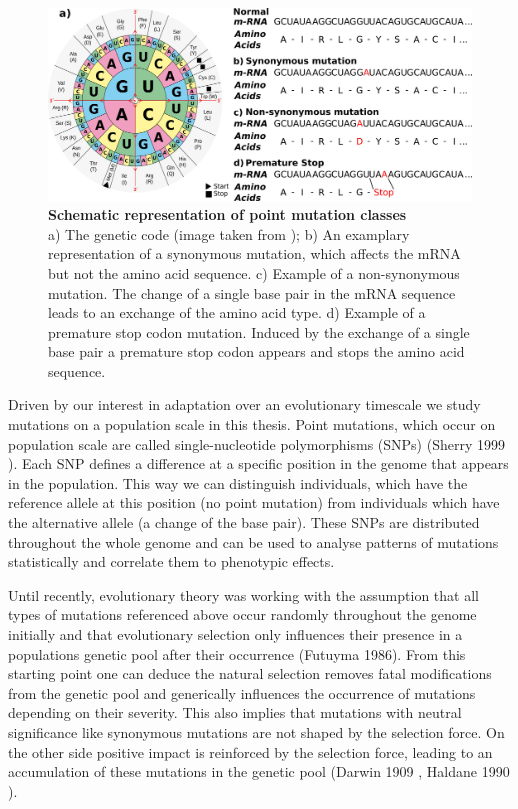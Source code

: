 \begin{figure}[tb]
    \centering
    \begin{minipage}[h]{0.9\textwidth}
      \centering
      \includegraphics[width=1\textwidth]{images/Mutations.png}
      \caption[Schematic representation of point mutation classes]{\textbf{Schematic representation of point mutation classes}\\
      a) The genetic code (image taken from \textcite{bresch2013}); b) An examplary representation of a synonymous mutation, which affects the mRNA but not the amino acid sequence. c) Example of a non-synonymous mutation. The change of a single base pair in the mRNA sequence leads to an exchange of the amino acid type. d) Example of a premature stop codon mutation. Induced by the exchange of a single base pair a premature stop codon appears and stops the amino acid sequence.}
     \label{fig:Codons}
    \end{minipage}
  \end{figure}
Driven by our interest in adaptation over an evolutionary timescale we study mutations on a population scale in this thesis. Point mutations, which occur on population scale are called single-nucleotide polymorphisms (SNPs) (Sherry 1999 \cite{sherry1999}). Each SNP defines a difference at a specific position in the genome that appears in the population. This way we can distinguish individuals, which have the reference allele at this position (no point mutation) from individuals which have the alternative allele (a change of the base pair). These SNPs are distributed throughout the whole genome and can be used to analyse patterns of mutations statistically and correlate them to phenotypic effects.

Until recently, evolutionary theory was working with the assumption that all types of mutations referenced above occur randomly throughout the genome initially and that evolutionary selection only influences their presence in a populations genetic pool after their occurrence (Futuyma 1986\cite{futuyma1986}). From this starting point one can deduce the natural selection removes fatal modifications from the genetic pool and generically influences the occurrence of mutations depending on their severity. This also implies that mutations with neutral significance like synonymous mutations are not shaped by the selection force. On the other side positive impact is reinforced by the selection force, leading to an accumulation of these mutations in the genetic pool (Darwin 1909 \cite{darwin1909}, Haldane 1990 \cite{Haldane1990}).

